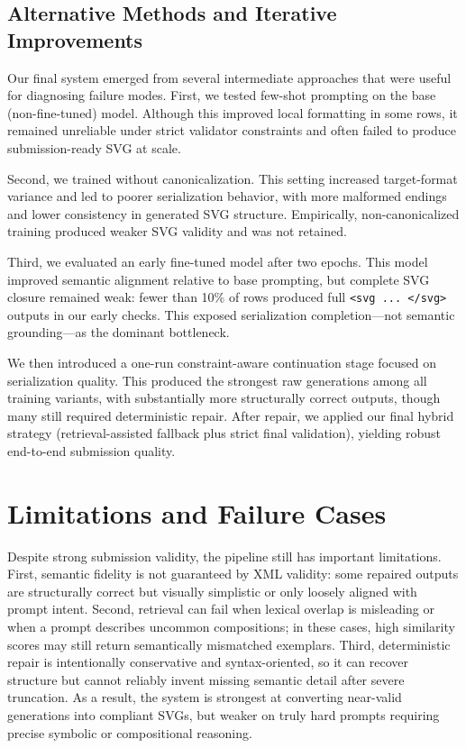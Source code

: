 \documentclass[11pt]{article}
\begin{document}
\subsection{Alternative Methods and Iterative Improvements}
Our final system emerged from several intermediate approaches that were useful for diagnosing failure modes.
First, we tested few-shot prompting on the base (non-fine-tuned) model.
Although this improved local formatting in some rows, it remained unreliable under strict validator constraints and often failed to produce submission-ready SVG at scale.

Second, we trained without canonicalization.
This setting increased target-format variance and led to poorer serialization behavior, with more malformed endings and lower consistency in generated SVG structure.
Empirically, non-canonicalized training produced weaker SVG validity and was not retained.

Third, we evaluated an early fine-tuned model after two epochs.
This model improved semantic alignment relative to base prompting, but complete SVG closure remained weak: fewer than 10\% of rows produced full \texttt{<svg ... </svg>} outputs in our early checks.
This exposed serialization completion---not semantic grounding---as the dominant bottleneck.

We then introduced a one-run constraint-aware continuation stage focused on serialization quality.
This produced the strongest raw generations among all training variants, with substantially more structurally correct outputs, though many still required deterministic repair.
After repair, we applied our final hybrid strategy (retrieval-assisted fallback plus strict final validation), yielding robust end-to-end submission quality.

\section{Limitations and Failure Cases}
Despite strong submission validity, the pipeline still has important limitations.
First, semantic fidelity is not guaranteed by XML validity: some repaired outputs are structurally correct but visually simplistic or only loosely aligned with prompt intent.
Second, retrieval can fail when lexical overlap is misleading or when a prompt describes uncommon compositions; in these cases, high similarity scores may still return semantically mismatched exemplars.
Third, deterministic repair is intentionally conservative and syntax-oriented, so it can recover structure but cannot reliably invent missing semantic detail after severe truncation.
As a result, the system is strongest at converting near-valid generations into compliant SVGs, but weaker on truly hard prompts requiring precise symbolic or compositional reasoning.
\end{document}
